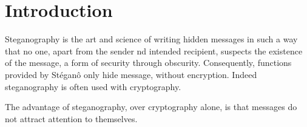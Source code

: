\section{Introduction}
Steganography is the art and science of writing hidden messages in such a way
that no one, apart from the sender nd intended recipient, suspects the
existence of the message, a form of security through obscurity. Consequently,
functions provided by Stéganô only hide message, without encryption. Indeed
steganography is often used with cryptography.

The advantage of steganography, over cryptography alone, is that messages do
not attract attention to themselves.